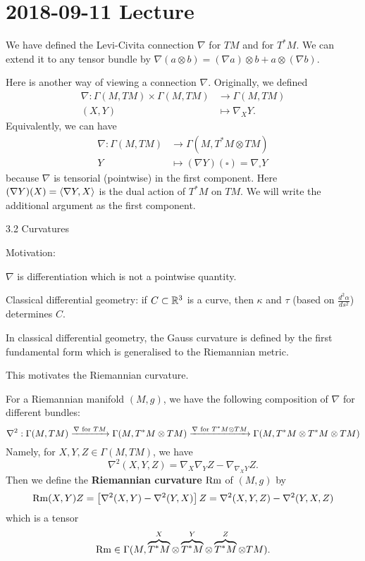 \section{2018-09-11 Lecture}

We have defined the Levi-Civita connection $\nabla$ for $TM$ and for $T^*M$.
We can extend it to any tensor bundle by $\nabla(a \otimes b) = (\nabla a)\otimes b + a \otimes (\nabla b)$.

Here is another way of viewing a connection $\nabla$.
Originally, we defined
\begin{align*}
  \nabla: \Gamma(M,TM) \times \Gamma(M,TM) &\to \Gamma(M,TM) \\
  (X,Y) &\mapsto \nabla_XY.
\end{align*}
Equivalently, we can have
\begin{align*}
  \nabla: \Gamma(M,TM) &\to \Gamma(M,T^*M \otimes TM) \\
  Y &\mapsto (\nabla Y)(\square) = \nabla_\square Y
\end{align*}
because $\nabla$ is tensorial (pointwise) in the first component.
Here $(\nabla Y)(X) = {\left\langle \nabla Y,X \right\rangle}$ is the dual action of $T^*M$ on $TM$. %
We will write the additional argument as the first component. %

3.2 Curvatures

Motivation:
\begin{enum}
  \io
  $\nabla$ is differentiation which is not a pointwise quantity.

  \io
  Classical differential geometry: if $C \subset \mathbb{R}^3$ is a curve, then $\kappa$ and $\tau$ (based on $\tfrac{d^2\alpha}{ds^2}$) determines $C$.
  
  \io
  In classical differential geometry, the Gauss curvature is defined by the first fundamental form which is generalised to the Riemannian metric.
\end{enum}

This motivates the Riemannian curvature.

\begin{defn}[3.12]
  For a Riemannian manifold $(M,g)$, we have the following composition of $\nabla$ for different bundles:
  \[ \nabla^2: \Gamma(M,TM) \xrightarrow{\nabla \text{ for } TM} \Gamma(M,T^*M \otimes TM) \xrightarrow{\nabla \text{ for } T^*M \otimes TM} \Gamma(M,T^*M\otimes T^*M\otimes TM) \]
  Namely, for $X,Y,Z\in\Gamma(M,TM)$, we have
  \[ \nabla^2(X,Y,Z) = \nabla_X\nabla_Y Z - \nabla_{\nabla_XY}Z. \]
  Then we define the \textbf{Riemannian curvature} $\operatorname{Rm}$ of $(M,g)$ by
  \[ \operatorname{Rm}(X,Y)Z = \left[ \nabla^2(X,Y) - \nabla^2(Y,X) \right]Z = \nabla^2(X,Y,Z) - \nabla^2(Y,X,Z) \]
  which is a tensor
  \[ \operatorname{Rm} \in \Gamma(M,\overbrace{T^*M}^X\otimes \overbrace{T^*M}^Y\otimes \overbrace{T^*M}^Z\otimes TM). \]
\end{defn}


